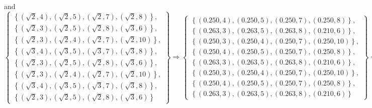 and
\begin{equation}
\left\{\begin{array}{c} 
\left\{\left(\sqrt{2},4\right),\left(\sqrt{2},5\right),\left(\sqrt{2},7\right),\left(\sqrt{2},8\right)\right\},\\
\left\{\left(\sqrt{2},3\right),\left(\sqrt{2},5\right),\left(\sqrt{2},8\right),\left(\sqrt{3},6\right)\right\},\\
\left\{\left(\sqrt{2},3\right),\left(\sqrt{2},4\right),\left(\sqrt{2},7\right),\left(\sqrt{2},10\right)\right\},\\
\left\{\left(\sqrt{3},4\right),\left(\sqrt{3},5\right),\left(\sqrt{3},7\right),\left(\sqrt{3},8\right)\right\},\\
\left\{\left(\sqrt{2},3\right),\left(\sqrt{2},5\right),\left(\sqrt{2},8\right),\left(\sqrt{3},6\right)\right\},\\
\left\{\left(\sqrt{2},3\right),\left(\sqrt{2},4\right),\left(\sqrt{2},7\right),\left(\sqrt{2},10\right)\right\},\\
\left\{\left(\sqrt{3},4\right),\left(\sqrt{3},5\right),\left(\sqrt{3},7\right),\left(\sqrt{3},8\right)\right\},\\
\left\{\left(\sqrt{2},3\right),\left(\sqrt{2},5\right),\left(\sqrt{2},8\right),\left(\sqrt{3},6\right)\right\}
\end{array}\right\}\Longrightarrow
\left\{\begin{array}{c} 
\left\{\left(0.250,4\right),\left(0.250,5\right),\left(0.250,7\right),\left(0.250,8\right)\right\},\\
\left\{\left(0.263,3\right),\left(0.263,5\right),\left(0.263,8\right),\left(0.210,6\right)\right\},\\
\left\{\left(0.250,3\right),\left(0.250,4\right),\left(0.250,7\right),\left(0.250,10\right)\right\},\\
\left\{\left(0.250,4\right),\left(0.250,5\right),\left(0.250,7\right),\left(0.250,8\right)\right\},\\
\left\{\left(0.263,3\right),\left(0.263,5\right),\left(0.263,8\right),\left(0.210,6\right)\right\},\\
\left\{\left(0.250,3\right),\left(0.250,4\right),\left(0.250,7\right),\left(0.250,10\right)\right\},\\
\left\{\left(0.250,4\right),\left(0.250,5\right),\left(0.250,7\right),\left(0.250,8\right)\right\},\\
\left\{\left(0.263,3\right),\left(0.263,5\right),\left(0.263,8\right),\left(0.210,6\right)\right\}
\end{array}\right\} = \left\{w_{t}^Y\right\}_o\;\;,
\end{equation}
